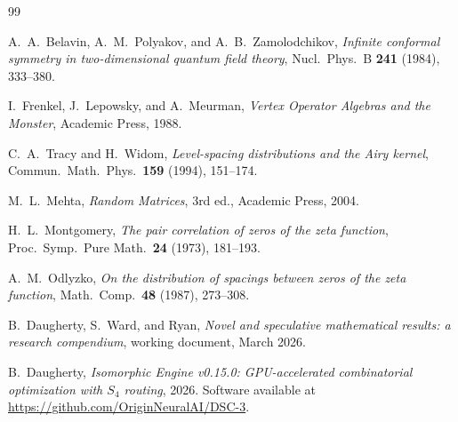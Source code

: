 \documentclass[11pt]{amsart}
\theoremstyle{definition}
\begin{document}
\begin{thebibliography}{99}

A.~A.~Belavin, A.~M.~Polyakov, and A.~B.~Zamolodchikov, \emph{Infinite conformal symmetry in two-dimensional quantum field theory}, Nucl.\ Phys.\ B \textbf{241} (1984), 333--380.

I.~Frenkel, J.~Lepowsky, and A.~Meurman, \emph{Vertex Operator Algebras and the Monster}, Academic Press, 1988.

C.~A.~Tracy and H.~Widom, \emph{Level-spacing distributions and the Airy kernel}, Commun.\ Math.\ Phys.\ \textbf{159} (1994), 151--174.

M.~L.~Mehta, \emph{Random Matrices}, 3rd ed., Academic Press, 2004.

H.~L.~Montgomery, \emph{The pair correlation of zeros of the zeta function}, Proc.\ Symp.\ Pure Math.\ \textbf{24} (1973), 181--193.

A.~M.~Odlyzko, \emph{On the distribution of spacings between zeros of the zeta function}, Math.\ Comp.\ \textbf{48} (1987), 273--308.

B.~Daugherty, S.~Ward, and Ryan, \emph{Novel and speculative mathematical results: a research compendium}, working document, March 2026.

B.~Daugherty, \emph{Isomorphic Engine v0.15.0: GPU-accelerated combinatorial optimization with $S_4$ routing}, 2026. Software available at \url{https://github.com/OriginNeuralAI/DSC-3}.

\end{thebibliography}
\end{document}
